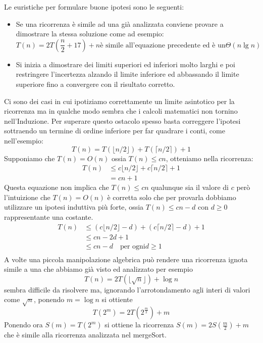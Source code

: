 Le euristiche per formulare buone ipotesi sono le seguenti:
\begin{itemize}
    \item Se una ricorrenza è simile ad una già analizzata conviene provare a dimostrare
          la stessa soluzione come ad esempio:
          \begin{equation*}
              T(n) = 2T(\frac{n}{2} + 17) + n \text{è simile all'equazione precedente ed è un} \Theta(n \lg n)
          \end{equation*}
    \item Si inizia a dimostrare dei limiti superiori ed inferiori molto larghi e
          poi restringere l'incertezza alzando il limite inferiore ed abbassando
          il limite superiore fino a convergere con il risultato corretto.
\end{itemize}


Ci sono dei casi in cui ipotiziamo correttamente un limite asintotico per la ricorrenza
ma in qualche modo sembra che i calcoli matematici non tornino nell'Induzione.
Per superare questo ostacolo spesso basta correggere l'ipotesi sottraendo un termine
di ordine inferiore per far quadrare i conti, come nell'esempio:
\[    T(n) = T(\lfloor n/2 \rfloor) + T(\lceil n/2 \rceil) + 1 \]
Supponiamo che $T(n) = O(n)$ ossia $T(n) \leq cn$, otteniamo nella ricorrenza:
\[ \begin{split}
    T(n) & \leq c \lfloor n/2 \rfloor + c \lceil n/2 \rceil + 1 \\
         & = cn + 1
 \end{split} \]
Questa equazione non implica che $T(n) \leq cn$ qualunque sia il valore di $c$ però
l'intuizione che $T(n) = O(n)$ è corretta solo che per provarla dobbiamo utilizzare
un ipotesi induttiva più forte, ossia $T(n) \leq cn - d$ con $d \geq 0$ rappresentante una costante.
\[ \begin{split}
    T(n) & \leq (c \lfloor n/2 \rfloor - d) + (c \lceil n/2 \rceil -d) + 1 \\
         & \leq cn - 2d + 1 \\
         & \leq cn - d \quad \text{per ogni} d \geq 1 \\
 \end{split} \]
A volte una piccola manipolazione algebrica può rendere una ricorrenza ignota simile a una che abbiamo già visto ed analizzato per esempio 
\[ T(n) = 2T(\lfloor \sqrt{n} \rfloor) + \log n \]
sembra difficile da risolvere ma, ignorando l'arrotondamento agli interi di valori come $\sqrt{n}$, ponendo $m = \log n$ si ottiente
\[ T(2^m) = 2T(2^{\frac{m}{2}}) + m \]
Ponendo ora $S(m) = T(2^m)$ si ottiene la ricorrenza $S(m) = 2S(\frac{m}{2}) + m$ che è simile alla ricorrenza analizzata nel mergeSort.
